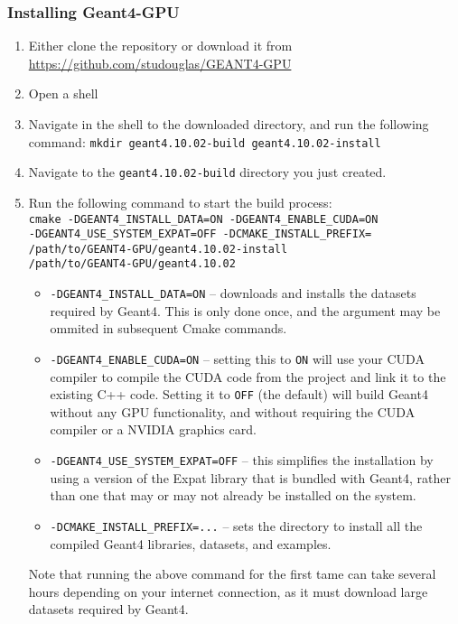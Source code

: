 \documentclass[12pt]{article}
\begin{document}
\subsubsection{Installing Geant4-GPU}
\begin{enumerate}
\item Either clone the repository or download it from \url{https://github.com/studouglas/GEANT4-GPU}
\item Open a shell
\item \label{StepMkdir} Navigate in the shell to the downloaded directory, and run the following command: \texttt{mkdir geant4.10.02-build geant4.10.02-install}
\item Navigate to the \texttt{geant4.10.02-build} directory you just created.
\item \label{StepCmake} Run the following command to start the build process:\\
\texttt{cmake -DGEANT4\_INSTALL\_DATA=ON -DGEANT4\_ENABLE\_CUDA=ON\\
 -DGEANT4\_USE\_SYSTEM\_EXPAT=OFF -DCMAKE\_INSTALL\_PREFIX=\\
 /path/to/GEANT4-GPU/geant4.10.02-install \\
 /path/to/GEANT4-GPU/geant4.10.02}
\begin{itemize}
\item \texttt{-DGEANT4\_INSTALL\_DATA=ON} -- downloads and installs the datasets required by Geant4. This is only done once, and the argument may be ommited in subsequent Cmake commands.
\item \texttt{-DGEANT4\_ENABLE\_CUDA=ON} -- setting this to \texttt{ON} will use your CUDA compiler to compile the CUDA code from the project and link it to the existing C++ code. Setting it to \texttt{OFF} (the default) will build Geant4 without any GPU functionality, and without requiring the CUDA compiler or a NVIDIA graphics card.
\item \texttt{-DGEANT4\_USE\_SYSTEM\_EXPAT=OFF} -- this simplifies the installation by using a version of the Expat library that is bundled with Geant4, rather than one that may or may not already be installed on the system. 
\item \texttt{-DCMAKE\_INSTALL\_PREFIX=...} -- sets the directory to install all the compiled Geant4 libraries, datasets, and examples.
\end{itemize}
Note that running the above command for the first tame can take several hours depending on your internet connection, as it must download large datasets required by Geant4.\\


\end{enumerate}
\end{document}
